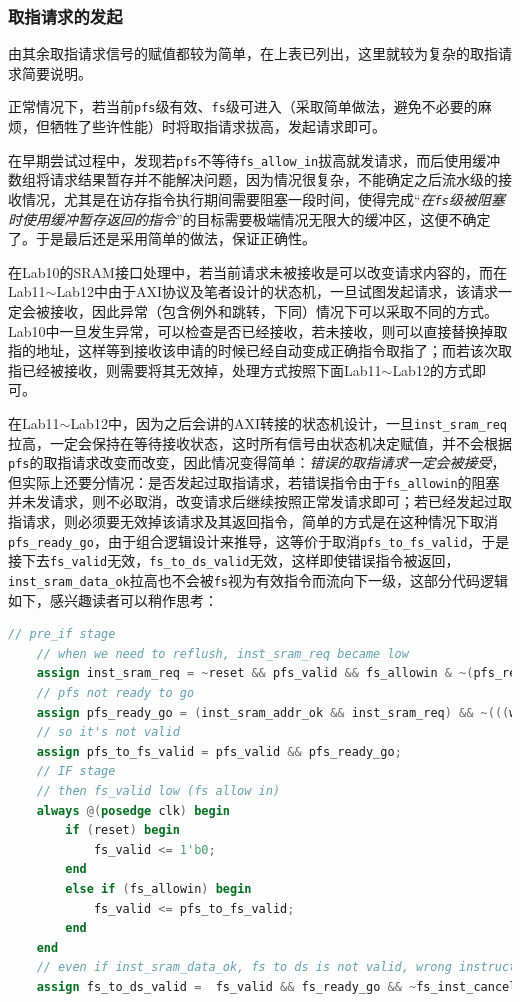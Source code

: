 \documentclass[UTF-8,twoside,c5size]{ctexart}
\begin{document}
	\subsubsection{取指请求的发起}
	
	由其余取指请求信号的赋值都较为简单，在上表已列出，这里就较为复杂的取指请求简要说明。
	
	正常情况下，若当前\texttt{pfs}级有效、\texttt{fs}级可进入（采取简单做法，避免不必要的麻烦，但牺牲了些许性能）时将取指请求拔高，发起请求即可。
	
	在早期尝试过程中，发现若\texttt{pfs}不等待\texttt{fs_allow_in}拔高就发请求，而后使用缓冲数组将请求结果暂存并不能解决问题，因为情况很复杂，不能确定之后流水级的接收情况，尤其是在访存指令执行期间需要阻塞一段时间，使得完成“\textsl{在\texttt{fs}级被阻塞时使用缓冲暂存返回的指令}”的目标需要极端情况无限大的缓冲区，这便不确定了。于是最后还是采用简单的做法，保证正确性。
		
	在Lab10的SRAM接口处理中，若当前请求未被接收是可以改变请求内容的，而在Lab11$\sim$Lab12中由于AXI协议及笔者设计的状态机，一旦试图发起请求，该请求一定会被接收，因此异常（包含例外和跳转，下同）情况下可以采取不同的方式。Lab10中一旦发生异常，可以检查是否已经接收，若未接收，则可以直接替换掉取指的地址，这样等到接收该申请的时候已经自动变成正确指令取指了；而若该次取指已经被接收，则需要将其无效掉，处理方式按照下面Lab11$\sim$Lab12的方式即可。
	
	在Lab11$\sim$Lab12中，因为之后会讲的AXI转接的状态机设计，一旦\texttt{inst_sram_req}拉高，一定会保持在等待接收状态，这时所有信号由状态机决定赋值，并不会根据\texttt{pfs}的取指请求改变而改变，因此情况变得简单：\textsl{错误的取指请求一定会被接受}，但实际上还要分情况：是否发起过取指请求，若错误指令由于\texttt{fs_allowin}的阻塞并未发请求，则不必取消，改变请求后继续按照正常发请求即可；若已经发起过取指请求，则必须要无效掉该请求及其返回指令，简单的方式是在这种情况下取消\texttt{pfs_ready_go}，由于组合逻辑设计来推导，这等价于取消\texttt{pfs_to_fs_valid}，于是接下去\texttt{fs_valid}无效，\texttt{fs_to_ds_valid}无效，这样即使错误指令被返回，\texttt{inst_sram_data_ok}拉高也不会被\texttt{fs}视为有效指令而流向下一级，这部分代码逻辑如下，感兴趣读者可以稍作思考：
	
	\begin{lstlisting}[language=verilog]
	// pre_if stage
	// when we need to reflush, inst_sram_req became low
    assign inst_sram_req = ~reset && pfs_valid && fs_allowin & ~(pfs_reflush);
    // pfs not ready to go
    assign pfs_ready_go = (inst_sram_addr_ok && inst_sram_req) && ~(((wb_ertn_r || wb_exc_r || br_stall_r) && pfs_reflush) || wb_exc || wb_ertn || br_stall);
    // so it's not valid
    assign pfs_to_fs_valid = pfs_valid && pfs_ready_go;
    // IF stage
    // then fs_valid low (fs allow in)
    always @(posedge clk) begin
        if (reset) begin
            fs_valid <= 1'b0;
        end
        else if (fs_allowin) begin
            fs_valid <= pfs_to_fs_valid;
        end
    end
    // even if inst_sram_data_ok, fs to ds is not valid, wrong instruction cancelled
    assign fs_to_ds_valid =  fs_valid && fs_ready_go && ~fs_inst_cancel;
	\end{lstlisting}
	
\end{document}
